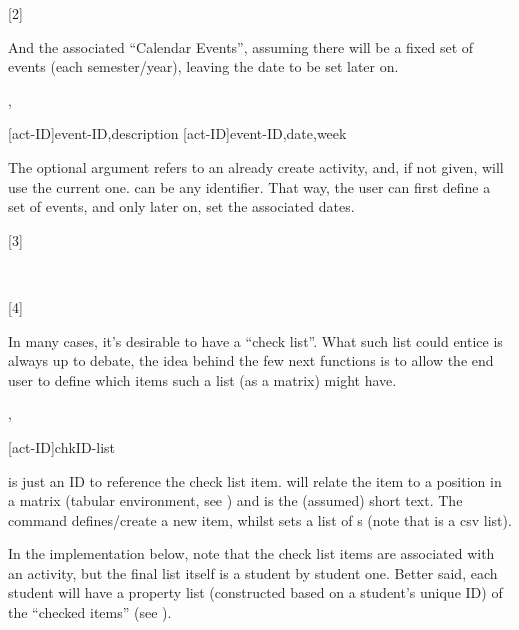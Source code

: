 \documentclass[10pt]{article}
\begin{document}
[2]



And the associated ``Calendar Events'', assuming there will be a fixed set of events (each semester/year), leaving the date to be set later on. 

\begin{codedescribe}{\ActivitySetNewEvent,\ActivitySetEventDay}
\begin{codesyntax}
  \tsmacro{\ActivitySetNewEvent}[act-ID]{event-ID,description}
  \tsmacro{\ActivitySetEventDay}[act-ID]{event-ID,date,week}
\end{codesyntax}
The optional argument  refers to an already create activity, and, if not given, will use the current one.  can be any identifier. That way, the user can first define a set of events, and only later on, set the associated dates.
\end{codedescribe}


[3]

~

[4]



In many cases, it's desirable to have a ``check list''. What such list could entice is always up to debate, the idea behind the few next functions is to allow the end user to define which items such a list (as a matrix) might have.

\begin{codedescribe}{\checkdef,\checklist}
\begin{codesyntax}
  \tsmacro{\checklist}[act-ID]{chkID-list}
\end{codesyntax}
   is just an ID to reference the check list item.  will relate the item to a position in a matrix (tabular environment, see \tsobj{\StudentCheckListTabLine}) and  is the (assumed) short text.
  The command \tsobj{\checkdef} defines/create a new item, whilst \tsobj{\checklist} sets a list of s (note that  is a csv list).
\end{codedescribe}
\begin{tsremark}
  In the implementation below, note that the check list items are associated with an activity, but the final list itself is a student by student one. Better said, each student will have a property list (constructed based on a student's unique ID) of the ``checked items'' (see \tsobj{\StudentCheckListTabLine}).
\end{tsremark}
\end{document}
